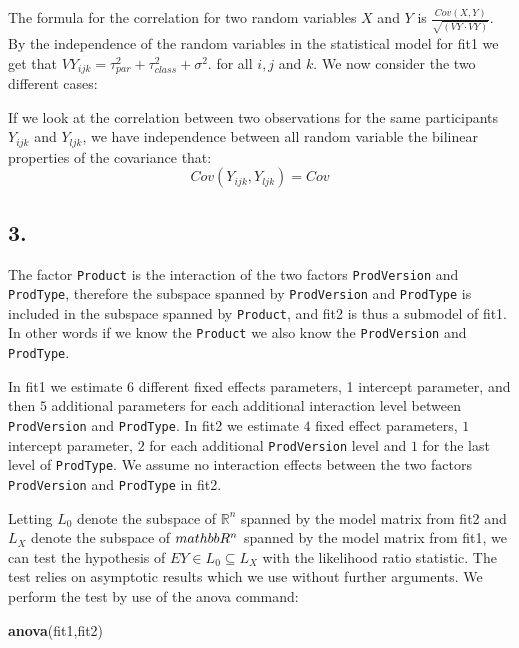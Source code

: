 \documentclass[
]{article}
\newenvironment{Shaded}{\begin{snugshade}}{\end{snugshade}}
\newcommand{\FunctionTok}[1]{\textcolor[rgb]{0.13,0.29,0.53}{\textbf{#1}}}
\newcommand{\NormalTok}[1]{#1}
\begin{document}
The formula for the correlation for two random variables \(X\) and \(Y\)
is \(\frac{Cov(X,Y)}{\sqrt{(VY\cdot VY)}}\). By the independence of the
random variables in the statistical model for fit1 we get that
\(VY_{ijk}=\tau_{par}^2+\tau_{class}^2+ \sigma^2\). for all \(i,j\) and
\(k\). We now consider the two different cases:

If we look at the correlation between two observations for the same
participants \(Y_{ijk}\) and \(Y_{ljk}\), we have independence between
all random variable the bilinear properties of the covariance that: \[
Cov(Y_{ijk},Y_{ljk}) = Cov
\]

\subsection{3.}\label{section-3}

The factor \texttt{Product} is the interaction of the two factors
\texttt{ProdVersion} and \texttt{ProdType}, therefore the subspace
spanned by \texttt{ProdVersion} and \texttt{ProdType} is included in the
subspace spanned by \texttt{Product}, and fit2 is thus a submodel of
fit1. In other words if we know the \texttt{Product} we also know the
\texttt{ProdVersion} and \texttt{ProdType}.

In fit1 we estimate \(6\) different fixed effects parameters, 1
intercept parameter, and then \(5\) additional parameters for each
additional interaction level between \texttt{ProdVersion} and
\texttt{ProdType}. In fit2 we estimate \(4\) fixed effect parameters,
\(1\) intercept parameter, \(2\) for each additional
\texttt{ProdVersion} level and \(1\) for the last level of
\texttt{ProdType}. We assume no interaction effects between the two
factors \texttt{ProdVersion} and \texttt{ProdType} in fit2.

Letting \(L_0\) denote the subspace of \(\mathbb{R}^n\) spanned by the
model matrix from fit2 and \(L_X\) denote the subspace of
\(\\mathbb{R}^n\) spanned by the model matrix from fit1, we can test the
hypothesis of \(EY \in L_0 \subseteq L_X\) with the likelihood ratio
statistic. The test relies on asymptotic results which we use without
further arguments. We perform the test by use of the anova command:

\begin{Shaded}
\begin{Highlighting}[]
\FunctionTok{anova}\NormalTok{(fit1,fit2)}
\end{Highlighting}
\end{Shaded}
\end{document}
